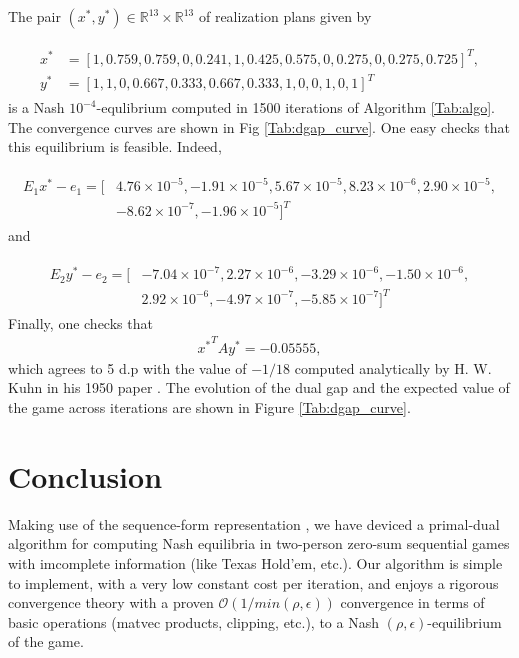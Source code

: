 \documentclass{article} %
\begin{document}
The pair $(x^*, y^*) \in \mathbb{R}^{13} \times \mathbb{R}^{13}$ of
realization plans given by

\begin{eqnarray*}
  \begin{split}
    x^* &= [1, 0.759, 0.759, 0, 0.241, 1, 0.425, 0.575, 0, 0.275, 0,
      0.275, 0.725]^T,\\
    y^* &= [1, 1, 0, 0.667, 0.333, 0.667, 0.333, 1, 0, 0, 1, 0, 1]^T
    \end{split}
\end{eqnarray*}
is a Nash $10^{-4}$-equlibrium computed in 1500 iterations of
Algorithm  \ref{Tab:algo}. The convergence curves are shown
in Fig \ref{Tab:dgap_curve}. One easy checks that this equilibrium is
feasible. Indeed,

\begin{eqnarray*}
  \begin{split}
    E_1x^* - e_1 = [&4.76 \times 10^{-5}, -1.91 \times 10^{-5}, 5.67
      \times 10^{-5}, 8.23 \times 10^{-6}, 2.90 \times 10^{-5}, \\&
      -8.62 \times 10^{-7}, -1.96 \times 10^{-5}]^T
    \end{split}
\end{eqnarray*}
and

\begin{eqnarray*}
  \begin{split}
    E_2y^* - e_2 = [&-7.04 \times 10^{-7}, 2.27 \times 10^{-6}, -3.29
      \times 10^{-6}, -1.50 \times 10^{-6},\\
      &2.92 \times 10^{-6}, -4.97 \times 10^{-7}, -5.85 \times
      10^{-7}]^T
    \end{split}
\end{eqnarray*}
Finally, one checks that
\begin{eqnarray*}
  {x^*}^TAy^* = {-0.05555},
\end{eqnarray*}
 which agrees to 5 d.p with the value of $-1 / 18$ computed
 analytically by H. W. Kuhn in his 1950 paper \cite{kuhn}. The
 evolution of the dual gap and the expected value of the game across
 iterations are shown in Figure \ref{Tab:dgap_curve}.


\section{Conclusion}
Making use of the sequence-form representation
\cite{koller1992complexity,von1996efficient,vonequilibrium}, we have
deviced a primal-dual algorithm for computing Nash equilibria in
two-person zero-sum sequential games with imcomplete information (like
Texas Hold'em, etc.). Our algorithm is simple to implement, with a
very low constant cost per iteration, and enjoys a rigorous
convergence theory with a proven $\mathcal{O}(1/min(\rho,\epsilon))$ convergence
in terms of basic operations (matvec products, clipping, etc.), to a
Nash $(\rho,\epsilon)$-equilibrium of the game.
\end{document}
